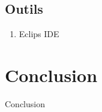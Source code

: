 \documentclass[12pt]{beamer}
\begin{document}
\subsection{Outils}
    \begin{frame}
        \begin{enumerate}
           \item Eclips IDE
       \end{enumerate}
    \end{frame}



\section{Conclusion}
\begin{frame}{Conclusion}
  
\end{frame}
\appendix[Questions ?]
\end{document}

